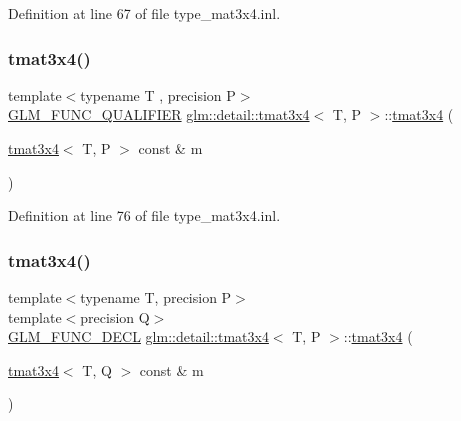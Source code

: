 Definition at line 67 of file type\+\_\+mat3x4.\+inl.

\mbox{\label{structglm_1_1detail_1_1tmat3x4_ad712792f2a164d4ed2f84ee31226cacd}} 
\subsubsection{\texorpdfstring{tmat3x4()}{tmat3x4()}\hspace{0.1cm}{\footnotesize\ttfamily [2/22]}}
{\footnotesize\ttfamily template$<$typename T , precision P$>$ \\
\hyperlink{setup_8hpp_a33fdea6f91c5f834105f7415e2a64407}{G\+L\+M\+\_\+\+F\+U\+N\+C\+\_\+\+Q\+U\+A\+L\+I\+F\+I\+ER} \hyperlink{structglm_1_1detail_1_1tmat3x4}{glm\+::detail\+::tmat3x4}$<$ T, P $>$\+::\hyperlink{structglm_1_1detail_1_1tmat3x4}{tmat3x4} (\begin{DoxyParamCaption}\item[{\hyperlink{structglm_1_1detail_1_1tmat3x4}{tmat3x4}$<$ T, P $>$ const \&}]{m }\end{DoxyParamCaption})}



Definition at line 76 of file type\+\_\+mat3x4.\+inl.

\mbox{\label{structglm_1_1detail_1_1tmat3x4_ab8b7d443036f14500e635408e42be95c}} 
\subsubsection{\texorpdfstring{tmat3x4()}{tmat3x4()}\hspace{0.1cm}{\footnotesize\ttfamily [3/22]}}
{\footnotesize\ttfamily template$<$typename T, precision P$>$ \\
template$<$precision Q$>$ \\
\hyperlink{setup_8hpp_ab2d052de21a70539923e9bcbf6e83a51}{G\+L\+M\+\_\+\+F\+U\+N\+C\+\_\+\+D\+E\+CL} \hyperlink{structglm_1_1detail_1_1tmat3x4}{glm\+::detail\+::tmat3x4}$<$ T, P $>$\+::\hyperlink{structglm_1_1detail_1_1tmat3x4}{tmat3x4} (\begin{DoxyParamCaption}\item[{\hyperlink{structglm_1_1detail_1_1tmat3x4}{tmat3x4}$<$ T, Q $>$ const \&}]{m }\end{DoxyParamCaption})}

